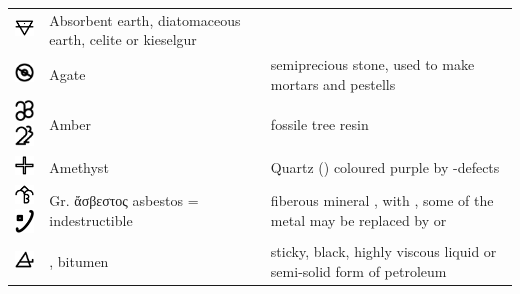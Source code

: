 \documentclass[british,final,landscape]{scrartcl}
\begin{document}
\begin{refsection}
 \tablelasttail{\bottomrule}\label{tab:mineral}
 \begin{supertabular}{p{0.3\textwidth}p{0.34\textwidth}p{0.34\textwidth}}
   \includegraphics[width=5mm]{Mineral/AbsorbentEarth} & Absorbent earth, diatomaceous earth, celite or kieselgur  & \\
   \includegraphics[width=5mm]{Mineral/Agate} & Agate & semiprecious stone, used to make mortars and pestells \\
   \includegraphics[width=5mm]{Mineral/Amber} \includegraphics[width=5mm]{Mineral/Amber2} & Amber & fossile tree resin \\
   \includegraphics[width=5mm]{Mineral/Amethyst} & Amethyst & Quartz () coloured purple by -defects \\
   \includegraphics[width=5mm]{Mineral/Asbestos} \includegraphics[width=5mm]{Mineral/Asbestos2} & Gr. \foreignlanguage{greek}{ἄσβεστος} asbestos = indestructible & fiberous mineral , with , some of the metal may be replaced by  or   \\
   \includegraphics[width=5mm]{Mineral/Bitumen} & , bitumen & sticky, black, highly viscous liquid or semi-solid form of petroleum \\

\end{supertabular}
\end{refsection}
\end{document}
